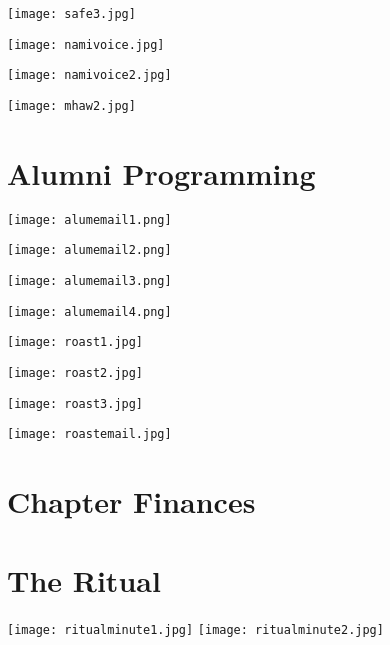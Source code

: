 \documentclass[a4paper,10pt]{article}
\begin{document}
    \texttt{[image: safe3.jpg]}
    
    \texttt{[image: namivoice.jpg]}
    
    \texttt{[image: namivoice2.jpg]}
    
    
    
    \texttt{[image: mhaw2.jpg]}
    
    
    
    \newpage
  \section{Alumni Programming}
    \texttt{[image: alumemail1.png]}
    
    \texttt{[image: alumemail2.png]}
    
    \texttt{[image: alumemail3.png]}
    
    \texttt{[image: alumemail4.png]}
    
    \texttt{[image: roast1.jpg]}
    
    \texttt{[image: roast2.jpg]}
    
    \texttt{[image: roast3.jpg]}
    
    \texttt{[image: roastemail.jpg]}
    
    
  
  \newpage
  \section{Chapter Finances}
    
    
    
    
    
    
    
  
  \newpage
  \section{The Ritual}
    \texttt{[image: ritualminute1.jpg]}
    \texttt{[image: ritualminute2.jpg]}
    
    
    
    
    \newpage
\end{document}
